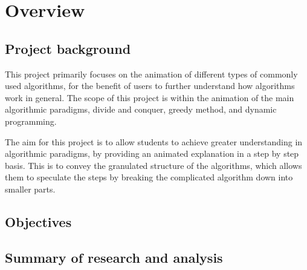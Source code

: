 \chapter{Overview}

\section{Project background}
This project primarily focuses on the animation of different types of commonly used algorithms, for the benefit of users to further understand how algorithms work in general. The scope of this project is within the animation of the main algorithmic paradigms, divide and conquer, greedy method, and dynamic programming. 

The aim for this project is to allow students to achieve greater understanding in algorithmic paradigms, by providing an animated explanation in a step by step basis. This is to convey the granulated structure of the algorithms, which allows them to speculate the steps by breaking the complicated algorithm down into smaller parts.

\section{Objectives}

\section{Summary of research and analysis}